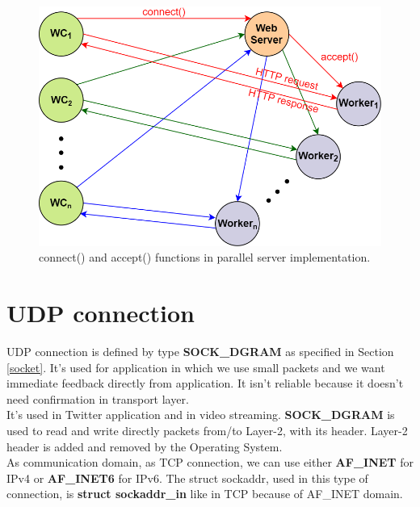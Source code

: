 \begin{figure}[H]
\centering
\includegraphics[scale=0.4]{Images/NetworkC/connect_accept}
\caption{\footnotesize{connect() and accept() functions in parallel server implementation.}}\label{connect_accept}
\end{figure}

\section{UDP connection}
UDP connection is defined by type \textbf{SOCK\_DGRAM} as specified in Section \ref{socket}. It's used for application in which we use small packets and we want immediate feedback directly from application. It isn't reliable because it doesn't need confirmation in transport layer.\\
It's used in Twitter application and in video streaming. \textbf{SOCK\_DGRAM} is used to read and write directly packets from/to Layer-2, with its header. Layer-2 header is added and removed by the Operating System.\\
As communication domain, as TCP connection, we can use either \textbf{AF\_INET} for IPv4 or \textbf{AF\_INET6} for IPv6. The struct sockaddr, used in this type of connection, is \textbf{struct sockaddr\_in} like in TCP because of AF\_INET domain.\\

